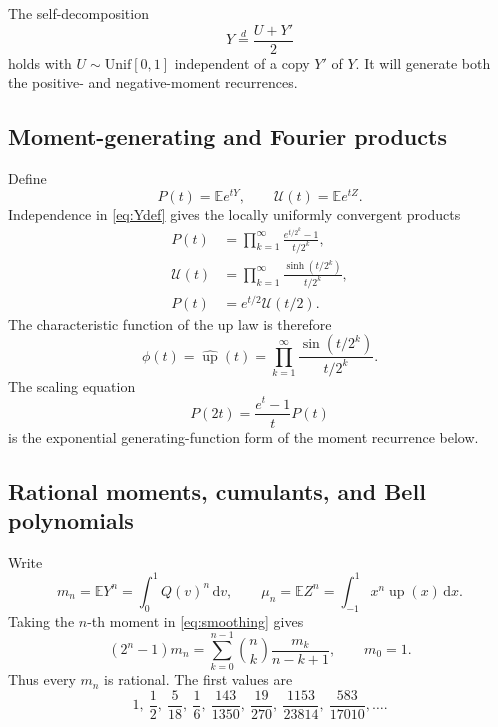 \documentclass[11pt,oneside]{article}
\theoremstyle{definition}
\newcommand{\Q}{Q}
\newcommand{\upf}{\operatorname{up}}
\newcommand{\E}{\mathbb E}
\newcommand{\dd}{\,\mathrm d}
\begin{document}
The self-decomposition
\begin{equation}\label{eq:smoothing}
 Y\overset d=\frac{U+Y'}2
\end{equation}
holds with \(U\sim\mathrm{Unif}[0,1]\) independent of a copy \(Y'\) of \(Y\).
It will generate both the positive- and negative-moment recurrences.

\subsection{Moment-generating and Fourier products}

Define
\begin{equation}\label{eq:P-U-products}
 P(t)=\E e^{tY},\qquad \mathcal U(t)=\E e^{tZ}.
\end{equation}
Independence in \cref{eq:Ydef} gives the locally uniformly convergent products
\begin{align}
 P(t)&=\prod_{k=1}^{\infty}
 \frac{e^{t/2^k}-1}{t/2^k},\label{eq:P-product}\\
 \mathcal U(t)&=\prod_{k=1}^{\infty}
 \frac{\sinh(t/2^k)}{t/2^k},\label{eq:U-product}\\
 P(t)&=e^{t/2}\mathcal U(t/2).\label{eq:P-U-relation}
\end{align}
The characteristic function of the up law is therefore
\begin{equation}\label{eq:phi-product}
 \phi(t)=\widehat{\upf}(t)
 =\prod_{k=1}^{\infty}\frac{\sin(t/2^k)}{t/2^k}.
\end{equation}
The scaling equation
\begin{equation}\label{eq:P-pantograph}
 P(2t)=\frac{e^t-1}{t}P(t)
\end{equation}
is the exponential generating-function form of the moment recurrence below.

\subsection{Rational moments, cumulants, and Bell polynomials}

Write
\begin{equation}\label{eq:mn-mun}
 m_n=\E Y^n=\int_0^1\Q(v)^n\dd v,
 \qquad
 \mu_n=\E Z^n=\int_{-1}^1x^n\upf(x)\dd x.
\end{equation}
Taking the \(n\)-th moment in \cref{eq:smoothing} gives
\begin{equation}\label{eq:moment-recurrence}
 (2^n-1)m_n
 =\sum_{k=0}^{n-1}\binom nk\frac{m_k}{n-k+1},
 \qquad m_0=1.
\end{equation}
Thus every \(m_n\) is rational.  The first values are
\begin{equation}\label{eq:first-moments}
 1,\ \frac12,\ \frac5{18},\ \frac16,\ \frac{143}{1350},\
 \frac{19}{270},\ \frac{1153}{23814},\ \frac{583}{17010},\ldots.
\end{equation}
\end{document}
